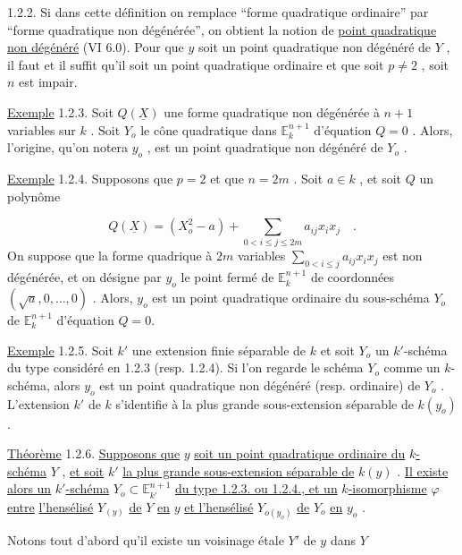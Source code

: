 1.2.2. Si dans cette définition on remplace ``forme quadratique ordinaire'' par ``forme quadratique non dégénérée'', on obtient la notion de \underline{point quadratique non dégénéré} (VI 6.0). Pour que $y$ soit un point quadratique non dégénéré de $Y$ , il faut et il suffit qu'il soit un point quadratique ordinaire et que soit $p \neq 2$ ,
soit $n$ est impair.

\underline{Exemple} 1.2.3. Soit $Q(\underline{X})$ une forme quadratique non dégénérée à $n+1$ variables sur $k$ . Soit $Y_o$ le cône quadratique dans $\mathbb{E}^{n+1}_k$ d'équation $Q = 0$ . Alors, l'origine, qu'on notera $y_o$ , est un point quadratique non dégénéré de $Y_o$ .

\underline{Exemple} 1.2.4. Supposons que $p = 2$ et que $n = 2m$ . Soit $a \in k$ , et soit $Q$ un polynôme

\begin{equation*}
Q(\underline{X}) = (X_o^2 - a) + \sum_{0<i\leq j\leq 2m} a_{ij}x_ix_j \quad .
\end{equation*}
On suppose que la forme quadrique à $2m$ variables $\sum_{0<i\leq j} a_{ij}x_ix_j$ est non dégénérée, et on désigne par $y_o$ le point fermé de $\mathbb{E}^{n+1}_k$ de coordonnées $(\sqrt{a},0,\ldots,0)$ . Alors, $y_o$ est un point quadratique ordinaire du sous-schéma $Y_o$ de $\mathbb{E}^{n+1}_k$ d'équation $Q = 0$.

\underline{Exemple} 1.2.5. Soit $k'$ une extension finie séparable de $k$ et soit $Y_o$ un $k'$-schéma du type considéré en 1.2.3 (resp. 1.2.4). Si l'on regarde le schéma $Y_o$ comme un $k$-schéma, alors $y_o$ est un point quadratique non dégénéré (resp. ordinaire) de $Y_o$ . L'extension $k'$ de $k$ s'identifie à la plus grande sous-extension séparable de $k(y_o)$ .

\underline{Théorème} 1.2.6. \underline{Supposons que} $y$ \underline{soit un point quadratique ordinaire du} \underline{$k$-schéma} $Y$ , \underline{et soit} $k'$ \underline{la plus grande sous-extension séparable de} $k(y)$ . \underline{Il existe alors un} \underline{$k'$-schéma} $Y_o \subset \mathbb{E}^{n+1}_{k'}$ \underline{du type 1.2.3. ou 1.2.4., et un} \underline{$k$-isomorphisme} $\varphi$ \underline{entre} \underline{l'hensélisé} $Y_{(y)}$ \underline{de} $Y$ \underline{en} $y$ \underline{et l'hensélisé} $Y_{o(y_o)}$ \underline{de} $Y_o$ \underline{en} $y_o$ .

Notons tout d'abord qu'il existe un voisinage étale $Y'$ de $y$ dans $Y$

